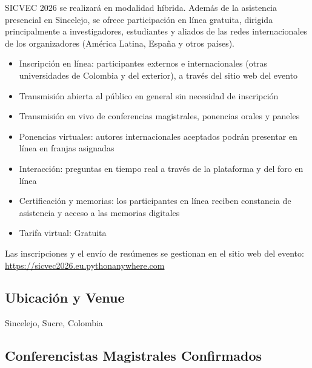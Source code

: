 \documentclass[12pt,a4paper]{article}
\begin{document}
\begin{tcolorbox}[cajainfo, title=Participación en línea para redes internacionales]
SICVEC 2026 se realizará en modalidad híbrida. Además de la asistencia presencial en Sincelejo, se ofrece participación en línea gratuita, dirigida principalmente a investigadores, estudiantes y aliados de las redes internacionales de los organizadores (América Latina, España y otros países).

\begin{itemize}[label={\textcolor{verdeosc}{\textbullet}}]
  \item Inscripción en línea: participantes externos e internacionales (otras universidades de Colombia y del exterior), a través del sitio web del evento
  \item Transmisión abierta al público en general sin necesidad de inscripción
  \item Transmisión en vivo de conferencias magistrales, ponencias orales y paneles
  \item Ponencias virtuales: autores internacionales aceptados podrán presentar en línea en franjas asignadas
  \item Interacción: preguntas en tiempo real a través de la plataforma y del foro en línea
  \item Certificación y memorias: los participantes en línea reciben constancia de asistencia y acceso a las memorias digitales
  \item Tarifa virtual: Gratuita
\end{itemize}
\end{tcolorbox}

Las inscripciones y el envío de resúmenes se gestionan en el sitio web del evento: \url{https://sicvec2026.eu.pythonanywhere.com}

\subsection{Ubicación y Venue}

\begin{tcolorbox}

Sincelejo, Sucre, Colombia
\end{tcolorbox}

\subsection{Conferencistas Magistrales Confirmados}
\end{document}
